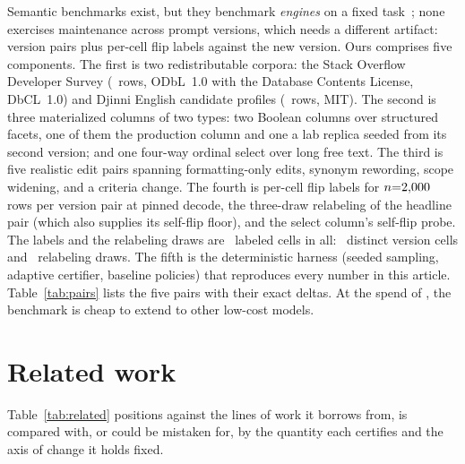 Semantic benchmarks exist, but they benchmark \emph{engines} on a fixed
task~\cite{sembench}; none exercises maintenance across prompt versions,
which needs a different artifact: version pairs plus per-cell flip labels
against the new version. Ours comprises five components. The first is
two redistributable corpora: the Stack Overflow Developer Survey
(\corpusSO\ rows, ODbL~1.0 with the Database Contents License,
DbCL~1.0) and Djinni English candidate
profiles (\corpusDjinni\ rows, MIT). The second is three materialized
columns of two types: two Boolean columns over structured facets, one of
them the production column and one a lab replica seeded from its second
version; and one four-way ordinal select over long free text. The third is
five realistic edit pairs spanning formatting-only edits, synonym
rewording, scope widening, and a criteria change. The fourth is per-cell
flip labels for $n{=}2{,}000$ rows per version pair at
pinned decode, the three-draw relabeling of the headline pair (which
also supplies its self-flip floor), and the select column's self-flip
probe. The labels and the relabeling draws are \ labeled
cells in all: \editLabelCells\ distinct version cells and
\drawLabelCells\ relabeling draws. The fifth is the deterministic
harness (seeded sampling, adaptive
certifier, baseline policies) that reproduces every number in this
article. Table~\ref{tab:pairs} lists the
five pairs with their exact deltas. At the spend of
, the benchmark is cheap to extend to other
low-cost models.

\keepheading
\section{Related work}
\label{sec:related}

Table~\ref{tab:related} positions \sivm{} against the lines of work it
borrows from, is compared with, or could be mistaken for, by the
quantity each certifies and the axis of change it holds fixed.

\keeprunin
